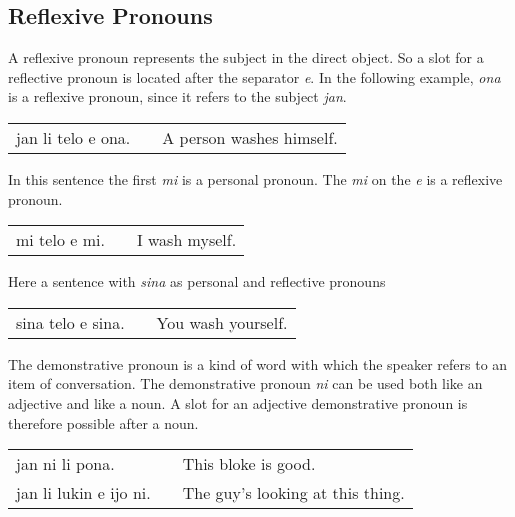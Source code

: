 \subsection*{Reflexive Pronouns}

A reflexive pronoun represents the subject in the direct object. 
So a slot for a reflective pronoun is located after the separator \textit{e}. 
In the following example, \textit{ona} is a reflexive pronoun, since it refers to the subject \textit{jan}. 

\begin{supertabular}{p{5,5cm}|ll}
jan li telo e ona. && A person washes himself. \\
\end{supertabular}

In this sentence the first \textit{mi} is a personal pronoun.
The \textit{mi} on the \textit{e} is a reflexive pronoun. 

\begin{supertabular}{p{5,5cm}|ll}
mi telo e mi. && I wash myself. \\
\end{supertabular}

Here a sentence with \textit{sina} as personal and reflective pronouns

\begin{supertabular}{p{5,5cm}|ll}
sina telo e sina. && You wash yourself. \\
\end{supertabular}

%
%

The demonstrative pronoun is a kind of word with which the speaker refers to an  item of conversation. 
The demonstrative pronoun \textit{ni} can be used both like an adjective and like a noun.  
A slot for an adjective demonstrative pronoun is therefore possible after a noun. 

\begin{supertabular}{p{5,5cm}|ll}
jan ni li pona. && This bloke is good. \\
jan li lukin e ijo ni. && The guy's looking at this thing. \\
\end{supertabular}

